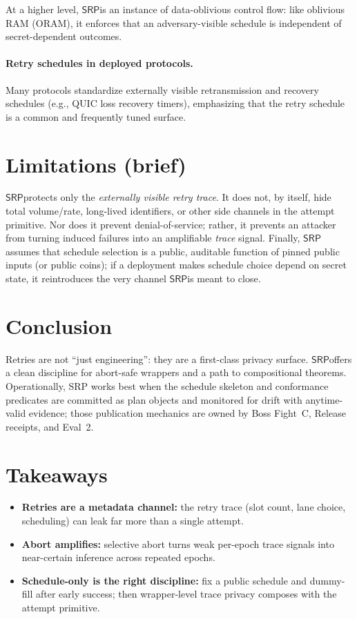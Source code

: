 \documentclass[11pt]{article}
\newcommand{\SRP}{\ensuremath{\mathsf{SRP}}}
\begin{document}
At a higher level, \SRP is an instance of data-oblivious control flow: like oblivious RAM (ORAM), it enforces that an adversary-visible schedule is independent of secret-dependent outcomes.\cite{goldreichOstrovskyORAM1996}

\paragraph{Retry schedules in deployed protocols.}
Many protocols standardize externally visible retransmission and recovery schedules (e.g., QUIC loss recovery timers),
emphasizing that the retry schedule is a common and frequently tuned surface.\cite{rfc9002}

\section{Limitations (brief)}
\label{sec:limitations}
\SRP protects only the \emph{externally visible retry trace}.
It does not, by itself, hide total volume/rate, long-lived identifiers, or other side channels in the attempt primitive.
Nor does it prevent denial-of-service; rather, it prevents an attacker from turning induced failures into an amplifiable \emph{trace} signal.
Finally, \SRP assumes that schedule selection is a public, auditable function of pinned public inputs (or public coins); if a deployment makes schedule choice depend on secret state, it reintroduces the very channel \SRP is meant to close.

\section{Conclusion}
Retries are not ``just engineering'': they are a first-class privacy surface.
\SRP offers a clean discipline for abort-safe wrappers and a path to compositional theorems.
Operationally, SRP works best when the schedule skeleton and conformance predicates are committed as plan objects and monitored for drift with anytime-valid evidence; those publication mechanics are owned by Boss Fight~C, Release receipts, and Eval~2.\cite{series:proofcarryingbudgets,series:releaseproperty,series:advantagecontracts}

\section{Takeaways}
\begin{itemize}[leftmargin=*]
\item \textbf{Retries are a metadata channel:} the retry trace (slot count, lane choice, scheduling) can leak far more than a single attempt.
\item \textbf{Abort amplifies:} selective abort turns weak per-epoch trace signals into near-certain inference across repeated epochs.
\item \textbf{Schedule-only is the right discipline:} fix a public schedule and dummy-fill after early success; then wrapper-level trace privacy composes with the attempt primitive.
\end{itemize}
\end{document}
